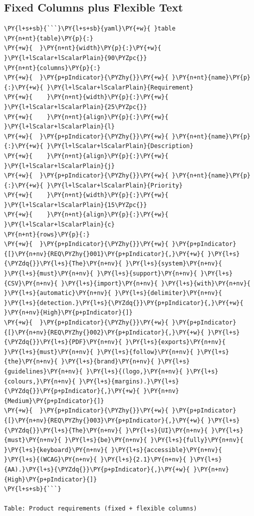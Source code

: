 \documentclass[a4paper,twoside]{article}
\begin{document}
\subsection{Fixed Columns plus Flexible Text}
\begin{tscode}[lang=markdown, engine=pygments]
\begin{Verbatim}[commandchars=\\\{\},breaklines, breakanywhere, commandchars=\\\{\}]
\PY{l+s+sb}{```}\PY{l+s+sb}{yaml}\PY{+w}{ }table
\PY{n+nt}{table}\PY{p}{:}
\PY{+w}{  }\PY{n+nt}{width}\PY{p}{:}\PY{+w}{ }\PY{l+lScalar+lScalarPlain}{90\PYZpc{}}
\PY{n+nt}{columns}\PY{p}{:}
\PY{+w}{  }\PY{p+pIndicator}{\PYZhy{}}\PY{+w}{ }\PY{n+nt}{name}\PY{p}{:}\PY{+w}{ }\PY{l+lScalar+lScalarPlain}{Requirement}
\PY{+w}{    }\PY{n+nt}{width}\PY{p}{:}\PY{+w}{ }\PY{l+lScalar+lScalarPlain}{25\PYZpc{}}
\PY{+w}{    }\PY{n+nt}{align}\PY{p}{:}\PY{+w}{ }\PY{l+lScalar+lScalarPlain}{l}
\PY{+w}{  }\PY{p+pIndicator}{\PYZhy{}}\PY{+w}{ }\PY{n+nt}{name}\PY{p}{:}\PY{+w}{ }\PY{l+lScalar+lScalarPlain}{Description}
\PY{+w}{    }\PY{n+nt}{align}\PY{p}{:}\PY{+w}{ }\PY{l+lScalar+lScalarPlain}{j}
\PY{+w}{  }\PY{p+pIndicator}{\PYZhy{}}\PY{+w}{ }\PY{n+nt}{name}\PY{p}{:}\PY{+w}{ }\PY{l+lScalar+lScalarPlain}{Priority}
\PY{+w}{    }\PY{n+nt}{width}\PY{p}{:}\PY{+w}{ }\PY{l+lScalar+lScalarPlain}{15\PYZpc{}}
\PY{+w}{    }\PY{n+nt}{align}\PY{p}{:}\PY{+w}{ }\PY{l+lScalar+lScalarPlain}{c}
\PY{n+nt}{rows}\PY{p}{:}
\PY{+w}{  }\PY{p+pIndicator}{\PYZhy{}}\PY{+w}{ }\PY{p+pIndicator}{[}\PY{n+nv}{REQ\PYZhy{}001}\PY{p+pIndicator}{,}\PY{+w}{ }\PY{l+s}{\PYZdq{}}\PY{l+s}{The}\PY{n+nv}{ }\PY{l+s}{system}\PY{n+nv}{ }\PY{l+s}{must}\PY{n+nv}{ }\PY{l+s}{support}\PY{n+nv}{ }\PY{l+s}{CSV}\PY{n+nv}{ }\PY{l+s}{import}\PY{n+nv}{ }\PY{l+s}{with}\PY{n+nv}{ }\PY{l+s}{automatic}\PY{n+nv}{ }\PY{l+s}{delimiter}\PY{n+nv}{ }\PY{l+s}{detection.}\PY{l+s}{\PYZdq{}}\PY{p+pIndicator}{,}\PY{+w}{ }\PY{n+nv}{High}\PY{p+pIndicator}{]}
\PY{+w}{  }\PY{p+pIndicator}{\PYZhy{}}\PY{+w}{ }\PY{p+pIndicator}{[}\PY{n+nv}{REQ\PYZhy{}002}\PY{p+pIndicator}{,}\PY{+w}{ }\PY{l+s}{\PYZdq{}}\PY{l+s}{PDF}\PY{n+nv}{ }\PY{l+s}{exports}\PY{n+nv}{ }\PY{l+s}{must}\PY{n+nv}{ }\PY{l+s}{follow}\PY{n+nv}{ }\PY{l+s}{the}\PY{n+nv}{ }\PY{l+s}{brand}\PY{n+nv}{ }\PY{l+s}{guidelines}\PY{n+nv}{ }\PY{l+s}{(logo,}\PY{n+nv}{ }\PY{l+s}{colours,}\PY{n+nv}{ }\PY{l+s}{margins).}\PY{l+s}{\PYZdq{}}\PY{p+pIndicator}{,}\PY{+w}{ }\PY{n+nv}{Medium}\PY{p+pIndicator}{]}
\PY{+w}{  }\PY{p+pIndicator}{\PYZhy{}}\PY{+w}{ }\PY{p+pIndicator}{[}\PY{n+nv}{REQ\PYZhy{}003}\PY{p+pIndicator}{,}\PY{+w}{ }\PY{l+s}{\PYZdq{}}\PY{l+s}{The}\PY{n+nv}{ }\PY{l+s}{UI}\PY{n+nv}{ }\PY{l+s}{must}\PY{n+nv}{ }\PY{l+s}{be}\PY{n+nv}{ }\PY{l+s}{fully}\PY{n+nv}{ }\PY{l+s}{keyboard}\PY{n+nv}{ }\PY{l+s}{accessible}\PY{n+nv}{ }\PY{l+s}{(WCAG}\PY{n+nv}{ }\PY{l+s}{2.1}\PY{n+nv}{ }\PY{l+s}{AA).}\PY{l+s}{\PYZdq{}}\PY{p+pIndicator}{,}\PY{+w}{ }\PY{n+nv}{High}\PY{p+pIndicator}{]}
\PY{l+s+sb}{```}

Table: Product requirements (fixed + flexible columns)
\end{Verbatim}
\end{tscode}
\end{document}
